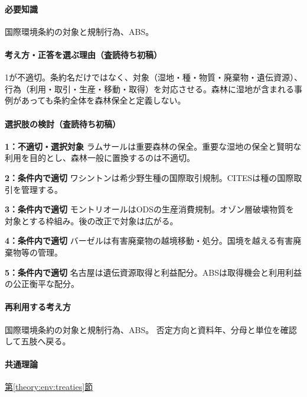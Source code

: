\paragraph{必要知識} 国際環境条約の対象と規制行為、ABS。

\paragraph{考え方・正答を選ぶ理由（査読待ち初稿）} 1が不適切。条約名だけではなく、対象（湿地・種・物質・廃棄物・遺伝資源）、行為（利用・取引・生産・移動・取得）を対応させる。森林に湿地が含まれる事例があっても条約全体を森林保全と定義しない。

\paragraph{選択肢の検討（査読待ち初稿）}\mbox{}\par

\noindent\textbf{1：不適切・選択対象} ラムサールは重要森林の保全。重要な湿地の保全と賢明な利用を目的とし、森林一般に置換するのは不適切。\par

\noindent\textbf{2：条件内で適切} ワシントンは希少野生種の国際取引規制。CITESは種の国際取引を管理する。\par

\noindent\textbf{3：条件内で適切} モントリオールはODSの生産消費規制。オゾン層破壊物質を対象とする枠組み。後の改正で対象は広がる。\par

\noindent\textbf{4：条件内で適切} バーゼルは有害廃棄物の越境移動・処分。国境を越える有害廃棄物等の管理。\par

\noindent\textbf{5：条件内で適切} 名古屋は遺伝資源取得と利益配分。ABSは取得機会と利用利益の公正衡平な配分。\par

\paragraph{再利用する考え方} 国際環境条約の対象と規制行為、ABS。 否定方向と資料年、分母と単位を確認して五肢へ戻る。

\paragraph{共通理論} \hyperref[theory:env:treaties]{第\ref*{theory:env:treaties}節}

